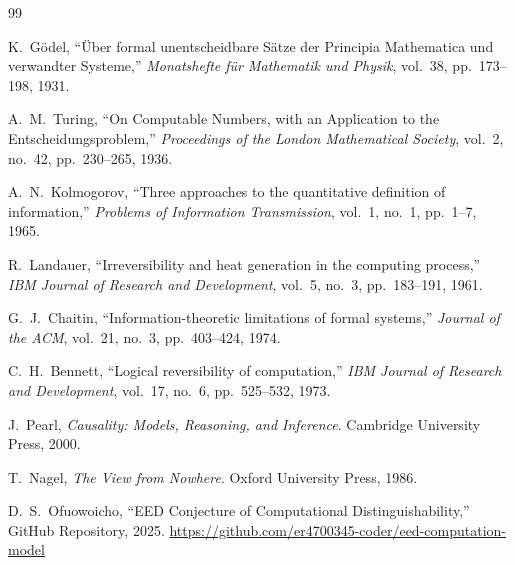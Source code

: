 \documentclass[12pt]{article}
\theoremstyle{definition}
\begin{document}
\begin{thebibliography}{99}

K.~G\"{o}del,
``\"{U}ber formal unentscheidbare S\"{a}tze der Principia Mathematica und verwandter Systeme,''
\emph{Monatshefte f\"{u}r Mathematik und Physik}, vol.~38, pp.~173--198, 1931.

A.~M.~Turing,
``On Computable Numbers, with an Application to the Entscheidungsproblem,''
\emph{Proceedings of the London Mathematical Society}, vol.~2, no.~42, pp.~230--265, 1936.

A.~N.~Kolmogorov,
``Three approaches to the quantitative definition of information,''
\emph{Problems of Information Transmission}, vol.~1, no.~1, pp.~1--7, 1965.

R.~Landauer,
``Irreversibility and heat generation in the computing process,''
\emph{IBM Journal of Research and Development}, vol.~5, no.~3, pp.~183--191, 1961.

G.~J.~Chaitin,
``Information-theoretic limitations of formal systems,''
\emph{Journal of the ACM}, vol.~21, no.~3, pp.~403--424, 1974.

C.~H.~Bennett,
``Logical reversibility of computation,''
\emph{IBM Journal of Research and Development}, vol.~17, no.~6, pp.~525--532, 1973.

J.~Pearl,
\emph{Causality: Models, Reasoning, and Inference}.
Cambridge University Press, 2000.

T.~Nagel,
\emph{The View from Nowhere}.
Oxford University Press, 1986.

D.~S.~Ofuowoicho,
``EED Conjecture of Computational Distinguishability,''
GitHub Repository, 2025.
\url{https://github.com/er4700345-coder/eed-computation-model}

\end{thebibliography}
\end{document}
